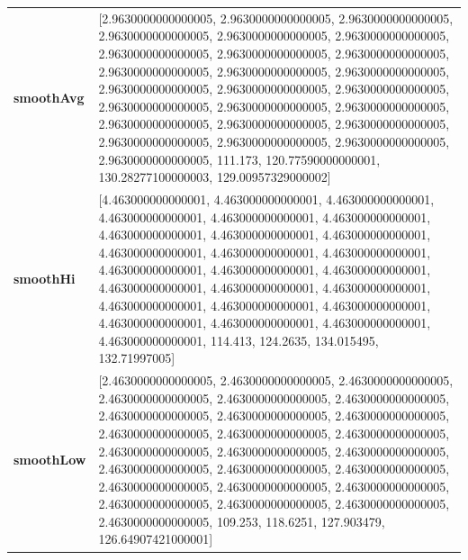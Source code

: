 						\begin{table}[H]
							\centering
							\begin{tabularx}{\textwidth}{lX}
		\textbf{smoothAvg}&  [2.9630000000000005, 2.9630000000000005, 2.9630000000000005, 2.9630000000000005, 2.9630000000000005, 2.9630000000000005, 2.9630000000000005, 2.9630000000000005, 2.9630000000000005, 2.9630000000000005, 2.9630000000000005, 2.9630000000000005, 2.9630000000000005, 2.9630000000000005, 2.9630000000000005, 2.9630000000000005, 2.9630000000000005, 2.9630000000000005, 2.9630000000000005, 2.9630000000000005, 2.9630000000000005, 2.9630000000000005, 2.9630000000000005, 2.9630000000000005, 2.9630000000000005, 111.173, 120.77590000000001, 130.28277100000003, 129.00957329000002] \\
		\textbf{smoothHi}& [4.463000000000001, 4.463000000000001, 4.463000000000001, 4.463000000000001, 4.463000000000001, 4.463000000000001, 4.463000000000001, 4.463000000000001, 4.463000000000001, 4.463000000000001, 4.463000000000001, 4.463000000000001, 4.463000000000001, 4.463000000000001, 4.463000000000001, 4.463000000000001, 4.463000000000001, 4.463000000000001, 4.463000000000001, 4.463000000000001, 4.463000000000001, 4.463000000000001, 4.463000000000001, 4.463000000000001, 4.463000000000001, 114.413, 124.2635, 134.015495, 132.71997005] \\
		\textbf{smoothLow} &[2.4630000000000005, 2.4630000000000005, 2.4630000000000005, 2.4630000000000005, 2.4630000000000005, 2.4630000000000005, 2.4630000000000005, 2.4630000000000005, 2.4630000000000005, 2.4630000000000005, 2.4630000000000005, 2.4630000000000005, 2.4630000000000005, 2.4630000000000005, 2.4630000000000005, 2.4630000000000005, 2.4630000000000005, 2.4630000000000005, 2.4630000000000005, 2.4630000000000005, 2.4630000000000005, 2.4630000000000005, 2.4630000000000005, 2.4630000000000005, 2.4630000000000005, 109.253, 118.6251, 127.903479, 126.64907421000001]\\
		
		
	\end{tabularx} 
\end{table}

